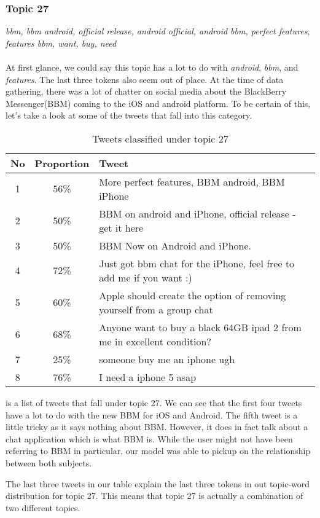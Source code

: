 \subsubsection{Topic 27}
\label{sec:topic_27}
\textit{bbm, bbm android, official release, android official, android bbm, perfect features, features bbm,
want, buy, need} \\\\
At first glance, we could say this topic has a lot to do with \textit{android}, \textit{bbm}, and
\textit{features}. The last three tokens also seem out of place. At the time of data gathering,
there was a lot of chatter on social media about the BlackBerry Messenger(BBM) coming to the iOS and
android platform. To be certain of this, let's take a look at some of the tweets that fall into this
category.\\

\begin{table}[H]
  \begin{tabular}{c c p{13cm}} \toprule
    No & Proportion & Tweet \\ \midrule
    1  & 56\%       & More perfect features, BBM android, BBM iPhone \\ \midrule
    2  & 50\%       & BBM on android and iPhone, official release - get it here \\ \midrule
    3  & 50\%       & BBM Now on Android and iPhone. \\ \midrule
    4  & 72\%       & Just got bbm chat for the iPhone, feel free to add me if you want :) \\ \midrule
    5  & 60\%       & Apple should create the option of removing yourself from a group chat \\ \midrule
    6  & 68\%       & Anyone want to buy a black 64GB ipad 2 from me in excellent condition? \\ \midrule
    7  & 25\%       & someone buy me an iphone ugh \\ \midrule
    8  & 76\%       & I need a iphone 5 asap \\ \bottomrule
  \end{tabular}
  \caption{Tweets classified under topic 27}
  \label{tab:tweets_under_27}
\end{table}

 is a list of tweets that fall under topic 27. We can see that the
first four tweets have a lot to do with the new BBM for iOS and Android. The fifth tweet is a little
tricky as it says nothing about BBM\@. However, it does in fact talk about a chat application which is
what BBM is. While the user might not have been referring to BBM in particular, our model was able
to pickup on the relationship between both subjects.

The last three tweets in our table explain the last three tokens in out topic-word distribution for
topic 27. This means that topic 27 is actually a combination of two different topics.


